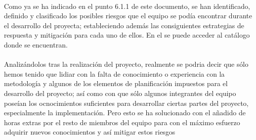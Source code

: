 \paragraph{}Como ya se ha indicado en el punto 6.1.1 de este documento, se han identificado, definido y clasificado los posibles riesgos que el equipo se podía encontrar durante el desarrollo del proyecta; estableciendo además las consiguientes estrategias de respuesta y mitigación para cada uno de ellos.
En el  se puede acceder al catálogo donde se encuentran.

\paragraph{}Analizándolos tras la realización del proyecto, realmente se podria decir que sólo hemos tenido que lidiar con la falta de conocimiento o experiencia con la metodología y algunos de los elementos de planificación impuestos para el desarrollo del proyecto; así como con que sólo algunos integrantes del equipo poseían los ocnocimientos suficientes para desarrollar ciertas partes del proyecto, especialmente la implementación. Pero esto se ha solucionado con el añadido de horas extras por el resto de miembros del equipo para con el máximo esfuerzo adquirir nuevos conocimientos y así mitigar estos riesgos